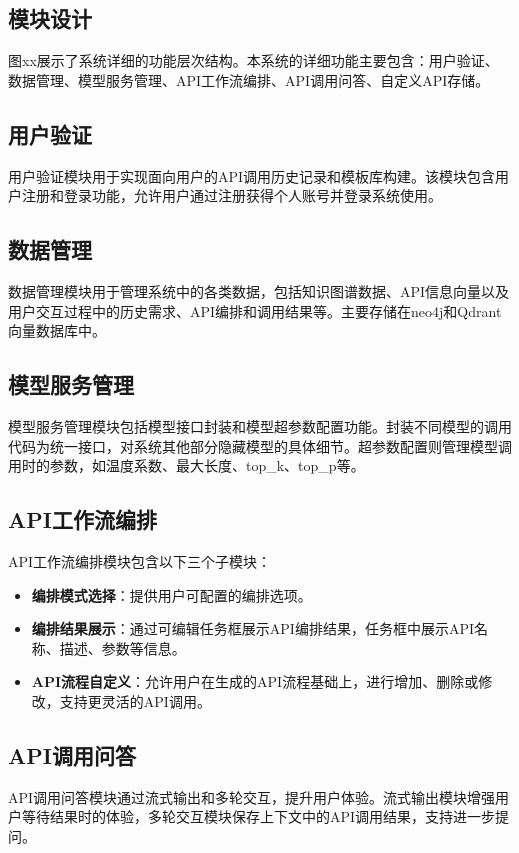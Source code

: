 \subsection{模块设计}

图xx展示了系统详细的功能层次结构。本系统的详细功能主要包含：用户验证、数据管理、模型服务管理、API工作流编排、API调用问答、自定义API存储。

\subsection{用户验证}
用户验证模块用于实现面向用户的API调用历史记录和模板库构建。该模块包含用户注册和登录功能，允许用户通过注册获得个人账号并登录系统使用。

\subsection{数据管理}
数据管理模块用于管理系统中的各类数据，包括知识图谱数据、API信息向量以及用户交互过程中的历史需求、API编排和调用结果等。主要存储在neo4j和Qdrant向量数据库中。

\subsection{模型服务管理}
模型服务管理模块包括模型接口封装和模型超参数配置功能。封装不同模型的调用代码为统一接口，对系统其他部分隐藏模型的具体细节。超参数配置则管理模型调用时的参数，如温度系数、最大长度、top\_k、top\_p等。

\subsection{API工作流编排}
API工作流编排模块包含以下三个子模块：
\begin{itemize}
    \item \textbf{编排模式选择}：提供用户可配置的编排选项。
    \item \textbf{编排结果展示}：通过可编辑任务框展示API编排结果，任务框中展示API名称、描述、参数等信息。
    \item \textbf{API流程自定义}：允许用户在生成的API流程基础上，进行增加、删除或修改，支持更灵活的API调用。
\end{itemize}

\subsection{API调用问答}
API调用问答模块通过流式输出和多轮交互，提升用户体验。流式输出模块增强用户等待结果时的体验，多轮交互模块保存上下文中的API调用结果，支持进一步提问。

